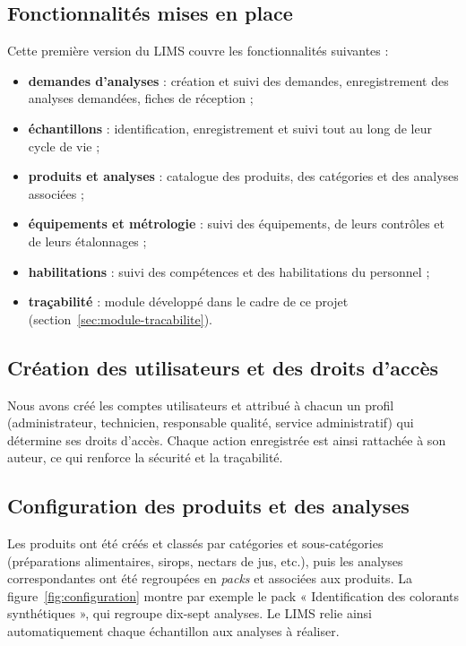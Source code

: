 \subsection{Fonctionnalités mises en place}

Cette première version du \ac{LIMS} couvre les fonctionnalités suivantes :
\begin{itemize}
    \item \textbf{demandes d'analyses} : création et suivi des demandes, enregistrement des analyses demandées, fiches de réception ;
    \item \textbf{échantillons} : identification, enregistrement et suivi tout au long de leur cycle de vie ;
    \item \textbf{produits et analyses} : catalogue des produits, des catégories et des analyses associées ;
    \item \textbf{équipements et métrologie} : suivi des équipements, de leurs contrôles et de leurs étalonnages ;
    \item \textbf{habilitations} : suivi des compétences et des habilitations du personnel ;
    \item \textbf{traçabilité} : module développé dans le cadre de ce projet (section~\ref{sec:module-tracabilite}).
\end{itemize}

\subsection{Création des utilisateurs et des droits d'accès}

Nous avons créé les comptes utilisateurs et attribué à chacun un profil (administrateur, technicien, responsable qualité, service administratif) qui détermine ses droits d'accès. Chaque action enregistrée est ainsi rattachée à son auteur, ce qui renforce la sécurité et la traçabilité.

\subsection{Configuration des produits et des analyses}

Les produits ont été créés et classés par catégories et sous-catégories (préparations alimentaires, sirops, nectars de jus, etc.), puis les analyses correspondantes ont été regroupées en \emph{packs} et associées aux produits. La figure~\ref{fig:configuration} montre par exemple le pack « Identification des colorants synthétiques », qui regroupe dix-sept analyses. Le \ac{LIMS} relie ainsi automatiquement chaque échantillon aux analyses à réaliser.


